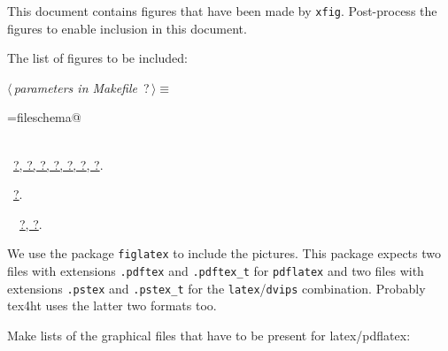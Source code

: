 \documentclass[twoside]{artikel3}
\renewcommand{\NWlink}[2]{\hyperlink{#1}{#2}}
\renewcommand{\NWtarget}[2]{\hypertarget{#1}{#2}}
\renewcommand{\NWsep}{$\diamond$\rule[-1\baselineskip]{0pt}{1\baselineskip}}
\renewcommand{\NWlink}[2]{\hyperlink{#1}{#2}}
\renewcommand{\NWtarget}[2]{\hypertarget{#1}{#2}}
\begin{document}
This document contains figures that have been made by
\texttt{xfig}. Post-process the figures to enable inclusion in this
document.

The list of figures to be included:

\begin{flushleft} \small
\begin{minipage}{\linewidth}\label{scrap13}\raggedright\small
\NWtarget{nuweb?}{} $\langle\,${\itshape parameters in Makefile}\nobreak\ {\footnotesize {?}}$\,\rangle\equiv$
\vspace{-1ex}
\begin{list}{}{} \item
\mbox{}\verb@FIGFILES=fileschema@\\
\mbox{}\verb@@\\
\mbox{}\verb@@{\NWsep}
\end{list}
\vspace{-1.5ex}
\footnotesize
\begin{list}{}{\setlength{\itemsep}{-\parsep}\setlength{\itemindent}{-\leftmargin}}
\item \NWtxtMacroDefBy\ \NWlink{nuweb?}{?}\NWlink{nuweb?}{, ?}\NWlink{nuweb?}{, ?}\NWlink{nuweb?}{, ?}\NWlink{nuweb?}{, ?}\NWlink{nuweb?}{, ?}\NWlink{nuweb?}{, ?}.
\item \NWtxtMacroRefIn\ \NWlink{nuweb?}{?}.
\item \NWtxtIdentsDefed\nobreak\  \verb@FIGFILES@\nobreak\ \NWlink{nuweb?}{?}\NWlink{nuweb?}{, ?}.
\item{}
\end{list}
\end{minipage}\vspace{4ex}
\end{flushleft}
We use the package \texttt{figlatex} to include the pictures. This
package expects two files with extensions \verb|.pdftex| and
\verb|.pdftex_t| for \texttt{pdflatex} and two files with extensions \verb|.pstex| and
\verb|.pstex_t| for the \texttt{latex}/\texttt{dvips}
combination. Probably tex4ht uses the latter two formats too.

Make lists of the graphical files that have to be present for
latex/pdflatex:
\end{document}
